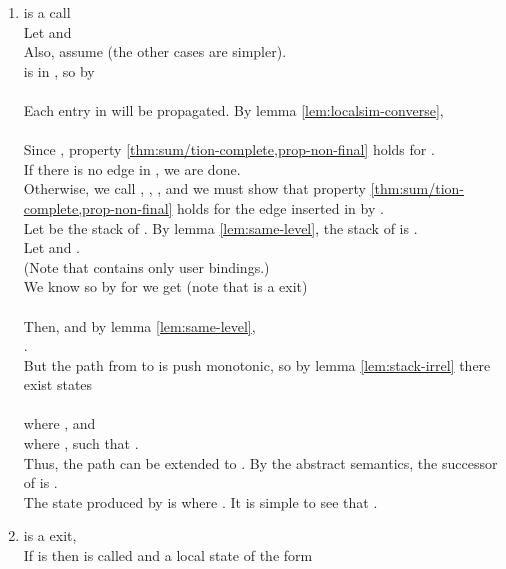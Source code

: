 \documentclass{LMCS}
\theoremstyle{definition} \newtheorem{property}[thm]{Property}
\begin{document}
\begin{enumerate}[]
\item
  \lstatw{} is a call \\
  Let  
  and  \\
  Also, assume  (the other cases are simpler). \\
   is in \seen, so by \ih \\
   \\
  Each entry \lstath{} in \succ{\lstatw} will be propagated.
  By lemma \ref{lem:localsim-converse}, \\
   \\
  Since , 
  property \ref{thm:sum/tion-complete,prop-non-final}
  holds for \lstath. \\
  If there is no edge  in \summary{}, we are done. \\
  Otherwise, we call \lstato, \lstatw, \lstath, \lstatf\srp{}
  and we must show that property \ref{thm:sum/tion-complete,prop-non-final}
  holds for the edge inserted in \seen{} by .
  \\
  Let  be the stack of \astato{}.
  By lemma \ref{lem:same-level}, the stack of \astatw{} is 
  . 
  \\
  Let 
  and . \\
  (Note that  contains only user bindings.) \\
  We know  so by \ih{} for  
  we get (note that \lstatf{} is a \dlceval{} exit) \\
   \\
  Then,  and by lemma \ref{lem:same-level}, \\
  . \\
  But the path from  to  is push monotonic, so by lemma
  \ref{lem:stack-irrel} there exist states \\
   \\
  where ,
  and  \\
  where , 
  such that . \\
  Thus, the path  can be extended to .
  By the abstract semantics, the successor \astat{} of \astatf{} is 
  . \\
  The state \lstat{} produced by  is 
   where .
  It is simple to see that .
\item
  \lstatw{} is a \dlceval{} exit, 
   \\
  If \lstato{} is \linitstate{} then \lstatw\srp{} is called
  and a local state \lstat{} of the form \\
  

\end{enumerate}
\end{document}
